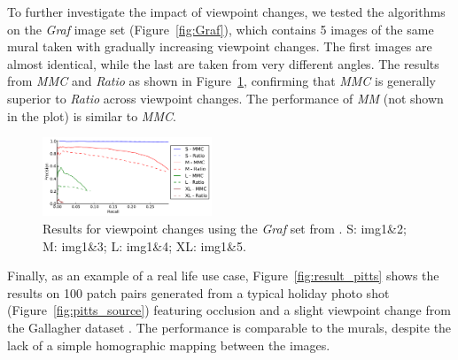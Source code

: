To further investigate the impact of viewpoint changes, we tested the 
algorithms on the \emph{Graf} image set (Figure~\ref{fig:Graf}), which 
contains 5 images of the same mural taken with gradually increasing 
viewpoint changes.  The first images are almost identical, while the 
last are taken from very different angles. The results from   \emph{MMC} 
and \emph{Ratio} as shown in Figure~\ref{fig:result_viewpoint}, 
confirming that \emph{MMC} is generally superior to \emph{Ratio} across 
viewpoint changes.
The performance of \emph{MM} (not shown in the plot) is similar to 
\emph{MMC}.

\begin{figure}[htb]
	\centering
	\includegraphics[width=0.45\textwidth]{images/result_viewpoint}
	\caption{Results for viewpoint changes using the \emph{Graf} set from 
		\cite{mikolajczyk2005performance}.  S: img1\&2; M: img1\&3; L: img1\&4; XL: img1\&5.}
	\label{fig:result_viewpoint}
\end{figure}


Finally, as an example of a real life use case, 
Figure~\ref{fig:result_pitts} shows the results on 100 patch pairs 
generated from a typical holiday photo shot 
(Figure~\ref{fig:pitts_source}) featuring occlusion and a slight 
viewpoint change from the Gallagher dataset \cite{gallagher2008}.  The 
performance is comparable to the murals, despite the lack of a simple 
homographic mapping between the images.


